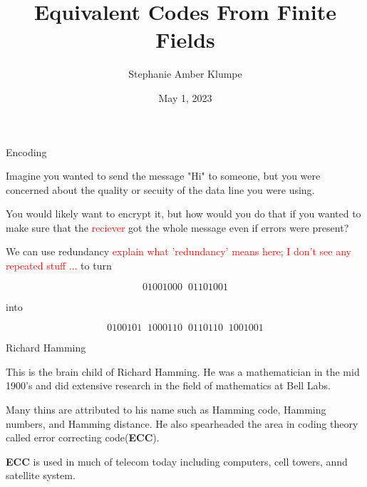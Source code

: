 \documentclass{beamer}
\title{Equivalent Codes From Finite Fields}
\author{Stephanie Amber Klumpe}
\institute{University of Colorado at Colorado Springs}
\date{May 1, 2023}
\begin{document}
\begin{frame}
    \titlepage
\end{frame}

\begin{frame}{Encoding}
    
    Imagine you wanted to send the message "Hi" to someone, but you were concerned about the quality
    or secuity of the data line you were using.

    \medskip

    \pause

    You would likely want to encrypt it, but how would you do that if you wanted to make sure that the
   \textcolor{red}{ reciever} got the whole message even if errors were present?

    \medskip

    \pause

    We can use redundancy
    \textcolor{red}{explain what 'redundancy' means here; I don't see any repeated stuff ...} to turn
    
    $$01001000\;\;01101001$$
    
    into
    
    $$0100101\;\;1000110\;\;0110110\;\;1001001$$

\end{frame}

\begin{frame}{Richard Hamming}
    
    This is the brain child of Richard Hamming. He was a mathematician in the mid 1900's and did
    extensive research in the field of mathematics at Bell Labs.

    \bigskip

    Many thins are attributed to his name such as Hamming code, Hamming numbers, and Hamming distance.
    He also spearheaded the area in coding theory called error correcting code(\textbf{ECC}).

    \bigskip

    \pause

    \textbf{ECC} is used in much of telecom today including computers, cell towers, annd satellite system.

\end{frame}
\end{document}
